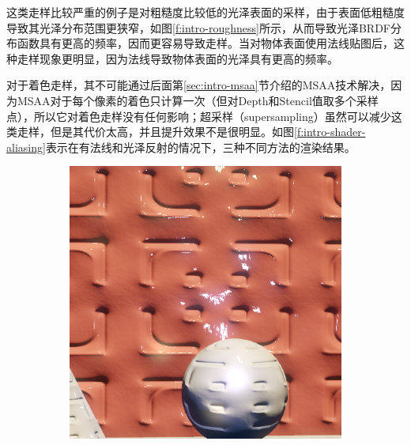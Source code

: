 这类走样比较严重的例子是对粗糙度比较低的光泽表面的采样，由于表面低粗糙度导致其光泽分布范围更狭窄，如图\ref{f:intro-roughness}所示，从而导致光泽BRDF分布函数具有更高的频率，因而更容易导致走样。当对物体表面使用法线贴图后，这种走样现象更明显，因为法线导致物体表面的光泽具有更高的频率。

对于着色走样，其不可能通过后面第\ref{sec:intro-msaa}节介绍的MSAA技术解决，因为MSAA对于每个像素的着色只计算一次（但对Depth和Stencil值取多个采样点），所以它对着色走样没有任何影响；超采样（supersampling）虽然可以减少这类走样，但是其代价太高，并且提升效果不是很明显。如图\ref{f:intro-shader-aliasing}表示在有法线和光泽反射的情况下，三种不同方法的渲染结果。

\begin{figure}
\begin{fullwidth}
	\begin{subfigure}[b]{0.33\thewidth}
		\includegraphics[width=1.\textwidth]{figures/intro/specaliasing_none}
	\end{subfigure}
	\begin{subfigure}[b]{0.33\thewidth}

\end{subfigure}
\end{fullwidth}
\end{figure}
